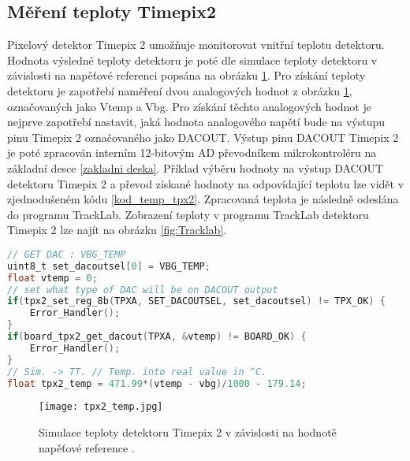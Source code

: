 \subsection{Měření teploty Timepix2}
\label{teplota}
Pixelový detektor Timepix 2 umožňuje monitorovat vnitřní teplotu detektoru. Hodnota výsledné teploty detektoru je poté dle simulace teploty detektoru v závislosti na napěťové referenci popsána na obrázku \ref{fig:tpx2_temp}. Pro získání teploty detektoru je zapotřebí naměření dvou analogových hodnot z obrázku \ref{fig:tpx2_temp}, označovaných jako Vtemp a Vbg. Pro získání těchto analogových hodnot je nejprve zapotřebí nastavit, jaká hodnota analogového napětí bude na výstupu pinu Timepix 2 označovaného jako DACOUT. Výstup pinu DACOUT Timepix 2 je poté zpracován interním 12-bitovým AD převodníkem mikrokontroléru na základní desce \ref{zakladni deska}. Příklad výběru hodnoty na výstup DACOUT detektoru Timepix 2 a převod získané hodnoty na odpovídající teplotu lze vidět v zjednodušeném kódu \ref{kod_temp_tpx2}. Zpracovaná teplota je následně odeslána do programu TrackLab. Zobrazení teploty v programu TrackLab detektoru Timepix 2 lze najít na obrázku \ref{fig:Tracklab}.  
\begin{lstlisting}[frame=single, language=C, caption={Výběr výstupu DACOUT detektoru Timepix2 a odečtení hodnoty detektoru.}, label=kod_temp_tpx2]
// GET DAC : VBG_TEMP
uint8_t set_dacoutsel[0] = VBG_TEMP; 
float vtemp = 0;
// set what type of DAC will be on DACOUT output								   
if(tpx2_set_reg_8b(TPXA, SET_DACOUTSEL, set_dacoutsel) != TPX_OK) {    
	Error_Handler();
}
if(board_tpx2_get_dacout(TPXA, &vtemp) != BOARD_OK) {
	Error_Handler();
}
// Sim. -> TT. // Temp. into real value in ^C.
float tpx2_temp = 471.99*(vtemp - vbg)/1000 - 179.14;					
\end{lstlisting}

\begin{figure}[h!]
	\centering
	\captionsetup{justification=centering}
	\texttt{[image: tpx2\_temp.jpg]}
	\caption{Simulace teploty detektoru Timepix 2 v závislosti na hodnotě napěťové reference \cite{tpx2_manual}.} 
	\label{fig:tpx2_temp}
\end{figure}

